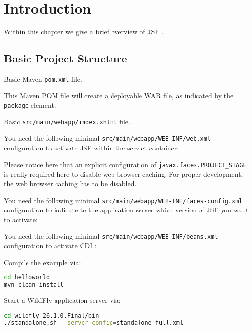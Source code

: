 %

\chapter{Introduction}

Within this chapter we give a brief overview of JSF \cite{JSF23}.

\section{Basic Project Structure}
Basic Maven \cite{ApacheMaven} \texttt{pom.xml} file.


This Maven POM file will create a deployable WAR file, as indicated by the \texttt{package} element.

Basic \texttt{src/main/webapp/index.xhtml} file.


You need the following minimal \texttt{src/main/webapp/WEB-INF/web.xml} configuration to activate JSF within the servlet container:


Please notice here that an explicit configuration of \texttt{javax.faces.PROJECT\_STAGE} is really required here to disable web browser caching.
For proper development, the web browser caching has to be disabled.

You need the following minimal \texttt{src/main/webapp/WEB-INF/faces-config.xml} configuration to indicate to the application server which version of JSF you want to activate:


You need the following minimal \texttt{src/main/webapp/WEB-INF/beans.xml} configuration to activate CDI \cite{CDI2}:


Compile the example via:
\begin{lstlisting}[language=bash]
cd helloworld
mvn clean install
\end{lstlisting}

Start a WildFly \cite{WildFly} application server via:
\begin{lstlisting}[language=bash]
cd wildfly-26.1.0.Final/bin
./standalone.sh --server-config=standalone-full.xml
\end{lstlisting}

